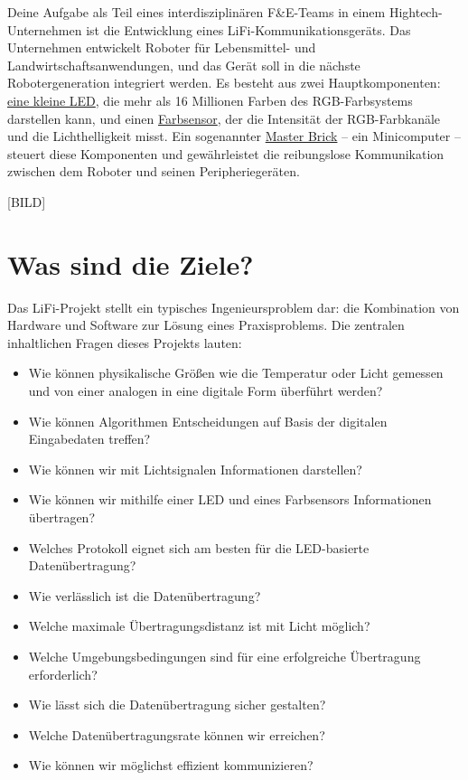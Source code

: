 \documentclass[
  letterpaper,
  DIV=11]{scrreprt}
\begin{document}
Deine Aufgabe als Teil eines interdisziplinären F\&E-Teams in einem
Hightech-Unternehmen ist die Entwicklung eines
LiFi-Kommunikationsgeräts. Das Unternehmen entwickelt Roboter für
Lebensmittel- und Landwirtschaftsanwendungen, und das Gerät soll in die
nächste Robotergeneration integriert werden. Es besteht aus zwei
Hauptkomponenten:
\href{https://www.tinkerforge.com/en/doc/Hardware/Bricklets/RGB_LED_V2.html}{eine
kleine LED}, die mehr als 16 Millionen Farben des RGB-Farbsystems
darstellen kann, und einen
\href{https://www.tinkerforge.com/en/doc/Hardware/Bricklets/Color_V2.html}{Farbsensor},
der die Intensität der RGB-Farbkanäle und die Lichthelligkeit misst. Ein
sogenannter
\href{https://www.tinkerforge.com/en/doc/Hardware/Bricks/Master_Brick.html}{Master
Brick} -- ein Minicomputer -- steuert diese Komponenten und
gewährleistet die reibungslose Kommunikation zwischen dem Roboter und
seinen Peripheriegeräten.

{[}BILD{]}

\section*{Was sind die Ziele?}\label{was-sind-die-ziele}


Das LiFi-Projekt stellt ein typisches Ingenieursproblem dar: die
Kombination von Hardware und Software zur Lösung eines Praxisproblems.
Die zentralen inhaltlichen Fragen dieses Projekts lauten:

\begin{itemize}
\item
  Wie können physikalische Größen wie die Temperatur oder Licht gemessen
  und von einer analogen in eine digitale Form überführt werden?
\item
  Wie können Algorithmen Entscheidungen auf Basis der digitalen
  Eingabedaten treffen?
\item
  Wie können wir mit Lichtsignalen Informationen darstellen?
\item
  Wie können wir mithilfe einer LED und eines Farbsensors Informationen
  übertragen?
\item
  Welches Protokoll eignet sich am besten für die LED-basierte
  Datenübertragung?
\item
  Wie verlässlich ist die Datenübertragung?
\item
  Welche maximale Übertragungsdistanz ist mit Licht möglich?
\item
  Welche Umgebungsbedingungen sind für eine erfolgreiche Übertragung
  erforderlich?
\item
  Wie lässt sich die Datenübertragung sicher gestalten?
\item
  Welche Datenübertragungsrate können wir erreichen?
\item
  Wie können wir möglichst effizient kommunizieren?
\end{itemize}
\end{document}
